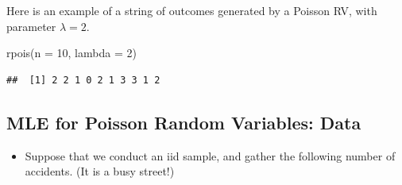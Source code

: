 \documentclass[
]{book}
\newenvironment{Shaded}{\begin{snugshade}}{\end{snugshade}}
\newcommand{\AttributeTok}[1]{\textcolor[rgb]{0.77,0.63,0.00}{#1}}
\newcommand{\DecValTok}[1]{\textcolor[rgb]{0.00,0.00,0.81}{#1}}
\newcommand{\FunctionTok}[1]{\textcolor[rgb]{0.00,0.00,0.00}{#1}}
\newcommand{\NormalTok}[1]{#1}
\providecommand{\tightlist}{%
  \setlength{\itemsep}{0pt}\setlength{\parskip}{0pt}}
\theoremstyle{definition}
\theoremstyle{definition}
\theoremstyle{definition}
\theoremstyle{definition}
\theoremstyle{remark}
\begin{document}
Here is an example of a string of outcomes generated by a Poisson RV, with parameter \(\lambda = 2\).

\begin{Shaded}
\begin{Highlighting}[]
\FunctionTok{rpois}\NormalTok{(}\AttributeTok{n =} \DecValTok{10}\NormalTok{, }\AttributeTok{lambda =} \DecValTok{2}\NormalTok{)}
\end{Highlighting}
\end{Shaded}

\begin{verbatim}
##  [1] 2 2 1 0 2 1 3 3 1 2
\end{verbatim}

\hypertarget{mle-for-poisson-random-variables-data}{%
\subsection{MLE for Poisson Random Variables: Data}\label{mle-for-poisson-random-variables-data}}

\begin{itemize}
\tightlist
\item
  Suppose that we conduct an iid sample, and gather the following number of accidents. (It is a busy street!)
\end{itemize}
\end{document}
